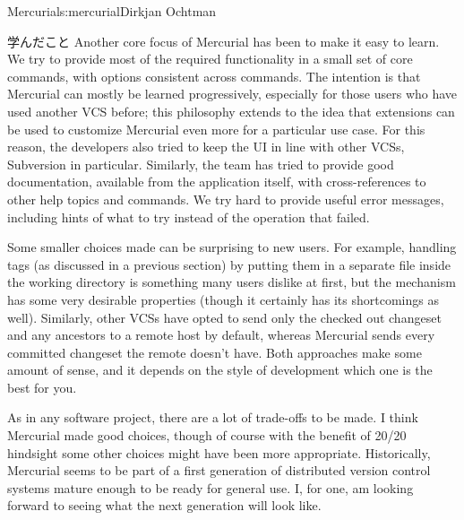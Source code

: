 \begin{aosachapter}{Mercurial}{s:mercurial}{Dirkjan Ochtman}
\begin{aosasect1}{学んだこと}
Another core focus of Mercurial has been to make it easy to learn.  We
try to provide most of the required functionality in a small set of
core commands, with options consistent across commands. The intention
is that Mercurial can mostly be learned progressively, especially for
those users who have used another VCS before; this philosophy extends
to the idea that extensions can be used to customize Mercurial even
more for a particular use case. For this reason, the developers also
tried to keep the UI in line with other VCSs, Subversion in
particular.  Similarly, the team has tried to provide good
documentation, available from the application itself, with
cross-references to other help topics and commands. We try hard to
provide useful error messages, including hints of what to try instead
of the operation that failed.

Some smaller choices made can be surprising to new users. For example,
handling tags (as discussed in a previous section) by putting them in
a separate file inside the working directory is something many users
dislike at first, but the mechanism has some very desirable properties
(though it certainly has its shortcomings as well). Similarly, other
VCSs have opted to send only the checked out changeset and any
ancestors to a remote host by default, whereas Mercurial sends every
committed changeset the remote doesn't have. Both approaches make some
amount of sense, and it depends on the style of development which one
is the best for you.

As in any software project, there are a lot of trade-offs to be made.
I think Mercurial made good choices, though of course with the benefit
of 20/20 hindsight some other choices might have been more appropriate.
Historically, Mercurial seems to be part of a first generation of
distributed version control systems mature enough to be ready for
general use. I, for one, am looking forward to seeing what the next
generation will look like.

\end{aosasect1}

\end{aosachapter}
